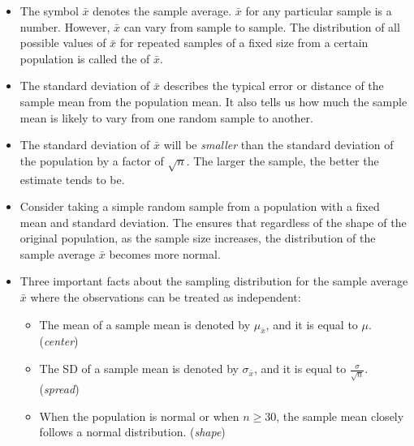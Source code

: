 \begin{itemize}
\item The symbol $\bar{x}$ denotes the sample average.  $\bar{x}$ for any particular sample is a number.  However, $\bar{x}$ can vary from sample to sample.  The distribution of all possible values of $\bar{x}$ for repeated samples of a fixed size from a certain population is called the  of $\bar{x}$.

\item The standard deviation of $\bar{x}$ describes the typical error or distance of the sample mean from the population mean.  It also tells us how much the sample mean is likely to vary from one random sample to another.  

\item The standard deviation of $\bar{x}$ will be \textit{smaller} than the standard deviation of the population by a factor of $\sqrt{n}$.  The larger the sample, the better the estimate tends to be.

\item Consider taking a simple random sample from a population with a fixed mean and standard deviation.  The  ensures that regardless of the shape of the original population, as the sample size increases, the distribution of the sample average $\bar{x}$ becomes more normal.  

\item Three important facts about the sampling distribution for the sample average $\bar{x}$ where the observations can be treated as independent:
\begin{itemize}\vspace{-1mm}
\setlength{\itemsep}{0mm}
\item The mean of a sample mean is denoted by $\mu_{\bar{x}}$, and it is equal to $\mu$. (\textit{center})
\item The SD of a sample mean is denoted by $\sigma_{\bar{x}}$, and it is equal to $\frac{\sigma}{\sqrt{n}}$.  (\textit{spread})
\item When the population is normal or when $n\ge 30$, the sample mean closely follows a normal distribution.   (\textit{shape})
\end{itemize}


\end{itemize}

